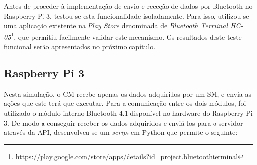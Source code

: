 Antes de proceder à implementação de envio e receção de dados por Bluetooth no Raspberry Pi 3, testou-se esta funcionalidade isoladamente. Para isso, utilizou-se uma aplicação existente na \textit{Play Store} denominada  de \textit{Bluetooth Terminal HC-05}\footnote{\url{https://play.google.com/store/apps/details?id=project.bluetoothterminal}}, que permitiu facilmente validar este mecanismo. Os resultados deste teste funcional serão apresentados no próximo capítulo. 



\subsection{Raspberry Pi 3}

Nesta simulação, o \acl{CM} recebe apenas os dados adquiridos por um \acl{SM}, e envia as ações que este terá que executar.  Para a comunicação entre os dois módulos, foi utilizado o módulo interno Bluetooth 4.1 disponível no hardware do Raspberry Pi 3. De modo a conseguir receber os dados adquiridos e enviá-los para o servidor através da \ac{API}, desenvolveu-se um \textit{script} em Python que permite o seguinte: 



